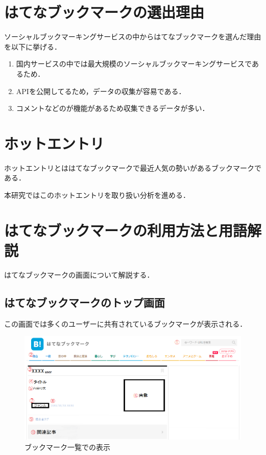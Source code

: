\section{はてなブックマークの選出理由}
ソーシャルブックマーキングサービスの中からはてなブックマークを選んだ理由を以下に挙げる．

\begin{enumerate}
\item 国内サービスの中では最大規模のソーシャルブックマーキングサービスであるため．
\item APIを公開してるため，データの収集が容易である．
\item コメントなどのが機能があるため収集できるデータが多い．
\end{enumerate}

\section{ホットエントリ}
ホットエントリとははてなブックマークで最近人気の勢いがあるブックマークである．\par
本研究ではこのホットエントリを取り扱い分析を進める．

\newpage

\section{はてなブックマークの利用方法と用語解説}
はてなブックマークの画面について解説する．

\subsection{はてなブックマークのトップ画面}
この画面では多くのユーザーに共有されているブックマークが表示される．

\begin{figure}[htb]
\centering
\includegraphics[width=15cm]{hatena-1.png}
\caption{ブックマーク一覧での表示}\label{hatenatop}
\end{figure}

